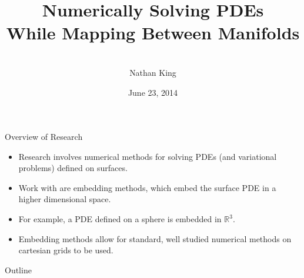 \documentclass{beamer}
\title[Manifold Mapping] %
{Numerically Solving PDEs \\While Mapping Between Manifolds}
\author[King] %
{\vspace{1cm}\\
Nathan King}
\institute[SFU] %
{
  Department of Mathematics\\
Simon Fraser University\\
 }
\date[June 23, 2014] %
{June 23, 2014}
\begin{document}
  
  
  
\begin{frame}
  \titlepage
\end{frame}





\begin{frame}{Overview of Research}
\begin{itemize}
\item Research involves numerical methods for solving PDEs (and variational problems) defined on surfaces.
\item Work with are embedding methods, which embed the surface PDE in a higher dimensional space.
\item For example, a PDE defined on a sphere is embedded in $\mathbb{R}^3.$
\item Embedding methods allow for standard, well studied numerical methods on cartesian grids to be used.
\end{itemize}
\end{frame}

\begin{frame}{Outline}
     \tableofcontents
\end{frame}
\end{document}
